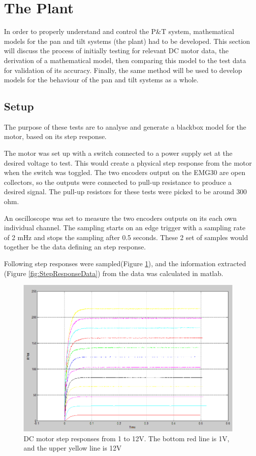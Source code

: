 \section{The Plant}
In order to properly understand and control the P\&T system, mathematical models for the pan and tilt systems (the plant) had to be developed. This section will discuss the process of initially testing for relevant DC motor data, the derivation of a mathematical model, then comparing this  model to the test data for validation of its accuracy. Finally, the same method will be used to develop models for the behaviour of the pan and tilt systems as a whole.

\subsection{Setup}
The purpose of these tests are to analyse and generate a blackbox model for the motor, based on its step response. 

The motor was set up with a switch connected to a power supply set at the desired voltage to test. This would create a physical step response from the motor when the switch was toggled. The two encoders output on the EMG30 are open collectors, so the outputs were connected to pull-up resistance to produce a desired signal. The pull-up resistors for these tests were picked to be around 300 ohm.

An oscilloscope was set to measure the two encoders outputs on its each own individual channel. The sampling starts on an edge trigger with a sampling rate of 2 mHz and stops the sampling after 0.5 seconds.
These 2 set of samples would together be the data defining an step response.

Following step responses were sampled(Figure \ref{fig:stepresponses1to12V}), and the information extracted (Figure \ref{fig:StepResponseData}) from the data was calculated in matlab. 

\begin{figure}[h!]
\centering
\includegraphics[scale=0.4]{Billeder/Stepresponses1to12V.png}
\caption{DC motor step responses from 1 to 12V. The bottom red line is 1V, and the upper yellow line is 12V}
\label{fig:stepresponses1to12V}
\end{figure}

